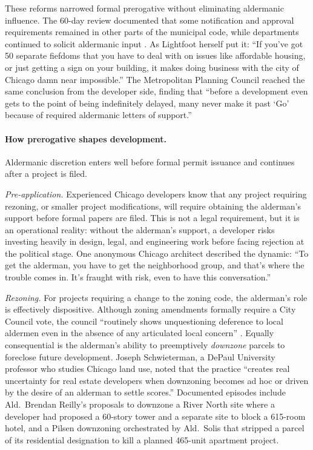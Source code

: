 These reforms narrowed formal prerogative without eliminating aldermanic influence.
The 60-day review documented that some notification and approval requirements remained in other parts of the municipal code, while departments continued to solicit aldermanic input \citep{city_of_chicago_sixty-day_2019}.
As Lightfoot herself put it: ``If
you've got 50 separate fiefdoms that you have to deal with on issues like affordable
housing, or just getting a sign on your building, it makes doing business with the
city of Chicago damn near impossible.''
\citep{spielman_lightfoot_2019} The
Metropolitan Planning Council reached the same conclusion from the developer side,
finding that ``before a development even gets to the point of being indefinitely
delayed, many never make it past `Go' because of required aldermanic letters of
support.''
\citep{metropolitan_planning_council_unfettered_2019}

\paragraph{How prerogative shapes development.}
Aldermanic
discretion enters well before formal permit issuance and continues after a project is filed.

\textit{Pre-application.}
Experienced Chicago developers know that any project
requiring rezoning, or smaller project modifications, will require 
obtaining the alderman's support before formal papers are filed.
This is not a
legal requirement, but it is an operational reality: without the alderman's support, a
developer risks investing heavily in design, legal, and engineering work
before facing rejection at the political stage.
One anonymous Chicago architect
described the dynamic: ``To get the alderman, you have to get the neighborhood
group, and that's where the trouble comes in.
It's fraught with risk, even to have
this conversation.''
\citep{giangreco_game_2024}

\textit{Rezoning.}
For projects requiring a change to the zoning code, the
alderman's role is effectively dispositive.
Although zoning amendments formally
require a City Council vote, the council ``routinely shows unquestioning deference
to local aldermen even in the absence of any articulated local concern''
\citep{chase_chicago_2023}.
Equally consequential is the alderman's ability to
preemptively \textit{downzone} parcels to foreclose future development.
Joseph
Schwieterman, a DePaul University professor who studies Chicago land use, noted
that the practice ``creates real uncertainty for real estate developers when
downzoning becomes ad hoc or driven by the desire of an alderman to settle scores.''
\citep{gallun_ad_2019} Documented episodes include Ald.\ Brendan Reilly's
proposals to downzone a River North site where a developer had proposed a 60-story
tower and a separate site to block a 615-room hotel, and a Pilsen downzoning
orchestrated by Ald.\ Solis that stripped a parcel of its residential designation
to kill a planned 465-unit apartment project.

